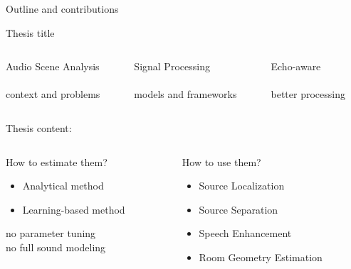 \begin{frame}{Outline and contributions}

    \begin{block}{Thesis title}

        \vspace*{2mm}
        \begin{columns}[onlytextwidth]
            \begin{column}[T]{0.3\linewidth}
                \centering
                \alert{Audio Scene Analysis}
                \\\downarrow
                \\context and problems
            \end{column}\hfill\pause
            \begin{column}[T]{0.3\linewidth}
                \centering
                \alert{Signal Processing}
                \\\downarrow
                \\models and frameworks
            \end{column}\hfill\pause
            \begin{column}[T]{0.3\linewidth}
                \centering
                \alert{Echo-aware}
                \\\downarrow
                \\better processing
            \end{column}\hfill
        \end{columns}
    \end{block}
    \pause

    \vfill
    \begin{block}{Thesis content:}

        \vspace*{2mm}
        \begin{columns}[T,onlytextwidth]
        \begin{column}{0.48\textwidth}
            \centering
            \alert{How to estimate them?}
            \begin{itemize}
                \item Analytical method
                \item Learning-based method
            \end{itemize}
            {\small no parameter tuning
            \\no full sound modeling}
        \end{column}
        \begin{column}{0.48\textwidth}
            \centering
            \alert{How to use them?}
            \begin{itemize}
                \item Source Localization
                \item Source Separation
                \item Speech Enhancement
                \item Room Geometry Estimation
            \end{itemize}
        \end{column}
    \end{columns}


\end{block}
\end{frame}
